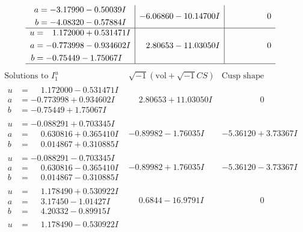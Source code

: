 \documentclass[1p]{elsarticle_modified}
\theoremstyle{definition}
\newcommand{\I}{\sqrt{-1}}
\begin{document}
$$\begin{array}{c|c|c}
\begin{aligned}
a &= -3.17990 - 0.50039 I \\
b &= -4.08320 - 0.57884 I\end{aligned}
 & -6.06860 - 10.14700 I & \phantom{-0.000000 } 0 \\ \hline\begin{aligned}
u &= \phantom{-}1.172000 + 0.531471 I \\
a &= -0.773998 - 0.934602 I \\
b &= -0.75449 - 1.75067 I\end{aligned}
 & \phantom{-}2.80653 - 11.03050 I & \phantom{-0.000000 } 0\\
 \hline 
 \end{array}$$\newpage$$\begin{array}{c|c|c}  
\text{Solutions to }I^u_{1}& \I (\text{vol} + \sqrt{-1}CS) & \text{Cusp shape}\\
 \hline 
\begin{aligned}
u &= \phantom{-}1.172000 - 0.531471 I \\
a &= -0.773998 + 0.934602 I \\
b &= -0.75449 + 1.75067 I\end{aligned}
 & \phantom{-}2.80653 + 11.03050 I & \phantom{-0.000000 } 0 \\ \hline\begin{aligned}
u &= -0.088291 + 0.703345 I \\
a &= \phantom{-}0.630816 + 0.365410 I \\
b &= \phantom{-}0.014867 + 0.310885 I\end{aligned}
 & -0.89982 - 1.76035 I & -5.36120 + 3.73367 I \\ \hline\begin{aligned}
u &= -0.088291 - 0.703345 I \\
a &= \phantom{-}0.630816 - 0.365410 I \\
b &= \phantom{-}0.014867 - 0.310885 I\end{aligned}
 & -0.89982 + 1.76035 I & -5.36120 - 3.73367 I \\ \hline\begin{aligned}
u &= \phantom{-}1.178490 + 0.530922 I \\
a &= \phantom{-}3.17450 - 1.01427 I \\
b &= \phantom{-}4.20332 - 0.89915 I\end{aligned}
 & \phantom{-}0.6844 - 16.9791 I & \phantom{-0.000000 } 0 \\ \hline\begin{aligned}
u &= \phantom{-}1.178490 - 0.530922 I \\

\end{aligned}
\end{array}$$
\end{document}
